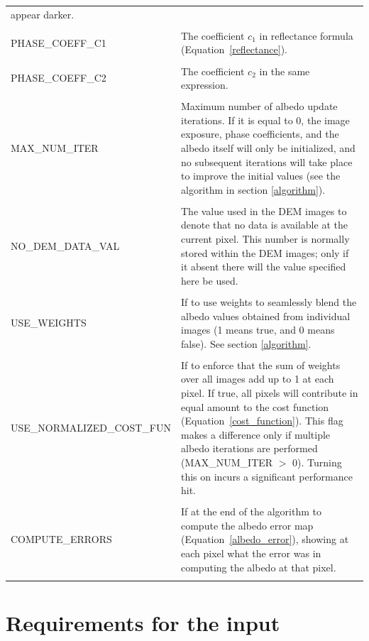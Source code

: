 \documentclass[letterpaper,fleqn,11pt]{report}
\begin{document}
\begin{longtable}{ l p{7cm} }
appear darker. \\
\\
PHASE\_COEFF\_C1  & The coefficient $c_1$ in reflectance formula (Equation~\ref{reflectance}).\\
\\
PHASE\_COEFF\_C2  & The coefficient $c_2$ in the same expression.\\
\\
MAX\_NUM\_ITER     &
Maximum number of albedo update iterations. If it is equal to 0, the image
exposure, phase coefficients, and the albedo itself will only be
initialized, and no subsequent iterations will take place to improve
the initial values (see the algorithm in section \ref{algorithm}).\\ 
\\
NO\_DEM\_DATA\_VAL &
The value used in the DEM images to denote that no data is available at the
current pixel. This number is normally stored within the DEM images;
only if it absent there will the value specified here be used.\\
\\
USE\_WEIGHTS &
 If to use weights to seamlessly blend the albedo values obtained from
 individual images (1 means true, and 0 means false). See section \ref{algorithm}.\\
\\
USE\_NORMALIZED\_COST\_FUN &
 If to enforce that the sum of weights over all images add up to 1 at
 each pixel.  If true, all pixels will contribute in equal amount to
 the cost function (Equation~\ref{cost_function}). This flag makes a difference only if multiple
 albedo iterations are performed (MAX\_NUM\_ITER $>$ 0). Turning this
 on incurs a significant performance hit.\\
\\
COMPUTE\_ERRORS   &
 If at the end of the algorithm to compute the albedo error map (Equation~\ref{albedo_error}), showing at each pixel what the error was in computing the albedo at that pixel.\\
\\

\end{longtable}

\section{Requirements for the input}\label{requirements}
\end{document}
